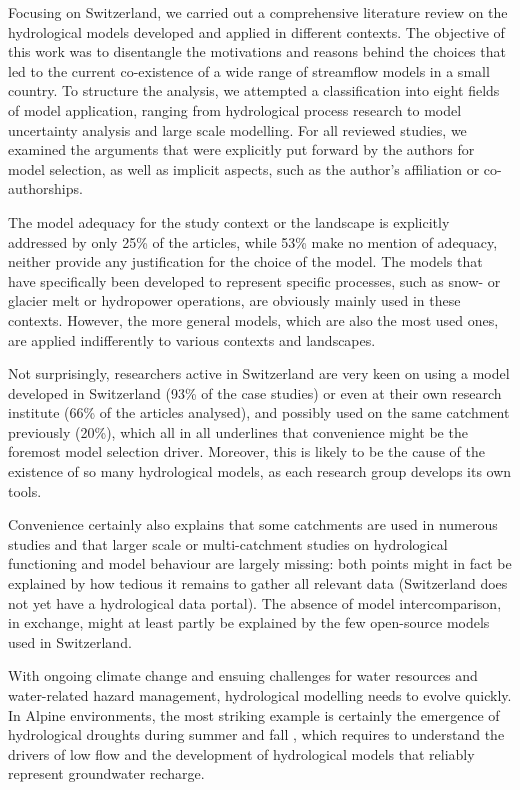 \documentclass[10pt,a4paper]{article}
\begin{document}
Focusing on Switzerland, we carried out a comprehensive literature review on the hydrological models developed and applied in different contexts. The objective of this work was to disentangle the motivations and reasons behind the choices that led to the current co-existence of a wide range of streamflow models in a small country. To structure the analysis, we attempted a classification into eight fields of model application, ranging from hydrological process research to model uncertainty analysis and large scale modelling. For all reviewed studies, we examined the arguments that were explicitly put forward by the authors for model selection, as well as implicit aspects, such as the author's affiliation or co-authorships. 

The model adequacy for the study context or the landscape is explicitly addressed by only 25\% of the articles, while 53\% make no mention of adequacy, neither provide any justification for the choice of the model. The models that have specifically been developed to represent specific processes, such as snow- or glacier melt or hydropower operations, are obviously mainly used in these contexts. However, the more general models, which are also the most used ones, are applied indifferently to various contexts and landscapes.

Not surprisingly, researchers active in Switzerland are very keen on using a model developed in Switzerland (93\% of the case studies) or even at their own research institute (66\% of the articles analysed), and possibly used on the same catchment previously (20\%), which all in all underlines that convenience might be the foremost model selection driver. Moreover, this is likely to be the cause of the existence of so many hydrological models, as each research group develops its own tools.

Convenience certainly also explains that some catchments are used in numerous studies and that larger scale or multi-catchment studies on hydrological functioning and model behaviour are largely missing: both points might in fact be explained by how tedious it remains to gather all relevant data (Switzerland does not yet have a hydrological data portal). The absence of model intercomparison, in exchange, might at least partly be explained by the few open-source models used in
Switzerland. 

With ongoing climate change and ensuing challenges for water resources and water-related hazard management, hydrological modelling needs to evolve quickly. In Alpine environments, the most striking example is certainly the emergence of hydrological droughts \citep{VanLoon2015} during summer and fall \citep{Brunner2019e, Rigling2020}, which requires to understand the drivers of low flow \citep{Arnoux2020} and the development of hydrological models that reliably represent groundwater recharge.
\end{document}
